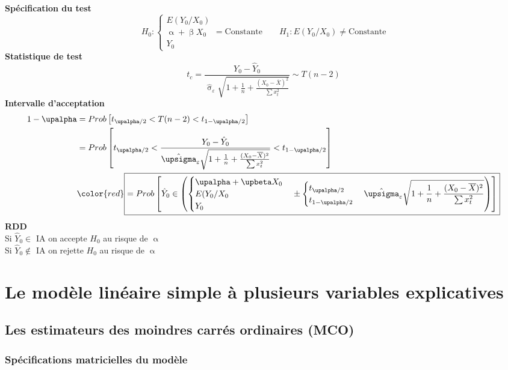 \documentclass{article}
\newcommand{\studn}{t_{\upalpha / 2}}
\newcommand{\studp}{t_{1 - \upalpha / 2}}
\begin{document}
\textbf{Spécification du test}
\begin{equation*}
	H_0 : \begin{cases} E(Y_0 / X_0) \\ \upalpha + \upbeta X_0 \\Y_0 \end{cases} = \text{Constante} \qquad H_1 : E(Y_0 /X_0) \neq \text{Constante}
\end{equation*}
\textbf{Statistique de test}
\begin{equation*}
		t_c = \frac{Y_0 - \hat{Y}_0 }{\hat{\upsigma}_\varepsilon \sqrt{1 + \frac{1}{n} + \frac{(X_0 - \overline{X})^2}{\sum x_t^2}}} \sim T(n-2)
\end{equation*}
\textbf{Intervalle d'acceptation}
\begin{equation*}
	\begin{split}	
		1 - \upalpha &= Prob\left[\studn < T(n-2) <\studp \right] \\
		&= Prob\left[\studn < \frac{Y_0 - \hat{Y}_0 }{\hat{\upsigma}_\varepsilon \sqrt{1 + \frac{1}{n} + \frac{(X_0 - \overline{X})^2}{\sum x_t^2}}} <\studp \right] \\
		&{\color{red}\boxed{= Prob\left[\hat{Y}_0 \in \left(\begin{cases}\upalpha + \upbeta X_0 \\ E(Y_0/X_0 \\ Y_0\end{cases} \pm \begin{cases}\studn \\ \studp\end{cases} \hat{\upsigma}_\varepsilon \sqrt{1 + \frac{1}{n} + \frac{(X_0 - \overline{X})^2}{\sum x_t^2}} \right)\right]}}
	\end{split}
\end{equation*}
\textbf{RDD} \\
Si $\hat{Y}_0 \in$ IA on accepte $H_0$ au risque de $\upalpha$ \\
Si $\hat{Y}_0 \notin$ IA on rejette $H_0$ au risque de $\upalpha$
\section{Le modèle linéaire simple à plusieurs variables explicatives}
\subsection{Les estimateurs des moindres carrés ordinaires (MCO)}
\subsubsection{Spécifications matricielles du modèle}
\end{document}
